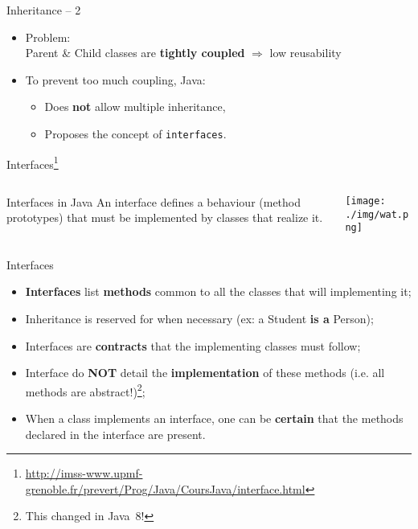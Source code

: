 \documentclass[English,c,%
hyperref={%
    pdftitle={FISA-DE2 OOP in Java},%
    pdfauthor={Muller, Gravier, Laforest, Subercaze},%
    pdfsubject={OOP in Java},%
    pdfkeywords={OOP, Java}%
    },%
xcolor={pdftex,svgnames} %
]{beamer}
\begin{document}
\begin{frame}{Inheritance -- 2}
\begin{itemize}
  \item Problem:\\
  Parent \& Child classes are \textbf{tightly coupled} $\Rightarrow$ low reusability
  \bigskip
  \item To prevent too much coupling, Java:
  \begin{itemize}
    \item Does \textbf{not} allow multiple inheritance,
    \item Proposes the concept of \texttt{interfaces}.
  \end{itemize}
\end{itemize}
\end{frame}


\begin{frame}{Interfaces\footnote{\url{http://imss-www.upmf-grenoble.fr/prevert/Prog/Java/CoursJava/interface.html}}}

 \begin{columns}[t]
  \begin{column}{.55\linewidth}
  \begin{block}{Interfaces in Java}
    An interface defines a behaviour (method prototypes) that must be
    implemented by classes that realize it.
  \end{block}
  \end{column}

  \begin{column}{.40\linewidth}
    \begin{block}{}
      \texttt{[image: ./img/wat.png]}
    \end{block}
  \end{column}
 \end{columns}

\end{frame}


\begin{frame}{Interfaces}
\begin{itemize}
    \item \textbf{Interfaces} list \textbf{methods} common to all the classes that will implementing it;
    \item Inheritance is reserved for when necessary (ex: a Student \textbf{is a} Person);
    \item Interfaces are \textbf{contracts} that the implementing classes must follow;
    \item Interface do \textbf{NOT} detail the \textbf{implementation} of these methods (i.e. all methods are abstract!)\footnote{This changed in Java~8!};
    \item When a class implements an interface, one can be \textbf{certain} that the methods declared in the interface are present.
\end{itemize}
\end{frame}
\end{document}
